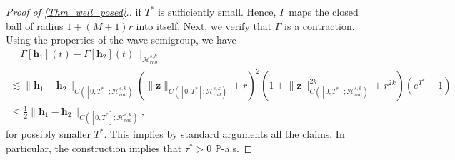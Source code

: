 \documentclass[12pt,reqno]{amsart}
\theoremstyle{plain}
\theoremstyle{remark}
\theoremstyle{plain}
\theoremstyle{definition}
\numberwithin{equation}{section}
\numberwithin{equation}{section}
\newcommand{\HH}{\mathcal{H}}
\begin{document}
\begin{proof}[Proof of \autoref{Thm_well_posed}.]
		if $T^*$ is sufficiently small. Hence, $\Gamma$ maps the closed ball of radius $1 + (M+1) r$ into itself. Next, we verify that $\Gamma$ is a contraction. Using the properties of the wave semigroup, we have
		\begin{multline*}
			\lVert\Gamma[\mathbf{h}_1](t)-\Gamma[\mathbf{h}_2](t)\rVert_{\HH_{rad}^{s,k}}\\ \lesssim \lVert \mathbf{h}_1-\mathbf{h}_2\rVert_{C([0,T^*];\HH_{rad}^{s,k})} \left(\lVert \mathbf{z}\rVert_{C([0,T^*];\HH_{rad}^{s,k})}+r\right)^2(1+\lVert \mathbf{z}\rVert_{C([0,T^*];\HH_{rad}^{s,k})}^{2k}+r^{2k})(e^{T^*}-1)  \\  \leq \frac{1}{2}\lVert\mathbf{h}_1-\mathbf{h}_2\rVert_{C([0,T^*];\HH_{rad}^{s,k})}, 
		\end{multline*}
		for possibly smaller $T^*$. This implies by standard arguments all the claims. In particular, the construction implies that $\tau^* > 0$ $\mathbb{P}$-a.s.
	\end{proof}
	
\end{document}
